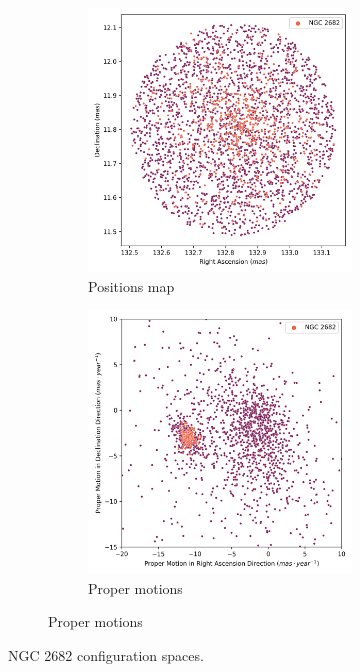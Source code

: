 \documentclass[11pt, a4paper, english]{book}
\begin{document}
\begin{figure}[htbp]
  \centering
  \begin{subfigure}{0.9\textwidth}
    \centering
    \begin{subfigure}[t]{0.45\textwidth}
      \centering
      \includegraphics[width=\textwidth]{../figures/ngc_2682/pos_ngc_2682.png}
      \caption{Positions map}
      \label{fig:pos_ngc_2682}
    \end{subfigure}
    \hfill
    \begin{subfigure}[t]{0.45\textwidth}
      \centering
      \includegraphics[width=\textwidth]{../figures/ngc_2682/pm_ngc_2682.png}
      \caption{Proper motions}
      \label{fig:pm_ngc_2682}
    \end{subfigure}
  \end{subfigure}
  \caption{NGC 2682 configuration spaces.}
\end{figure}
\end{document}
